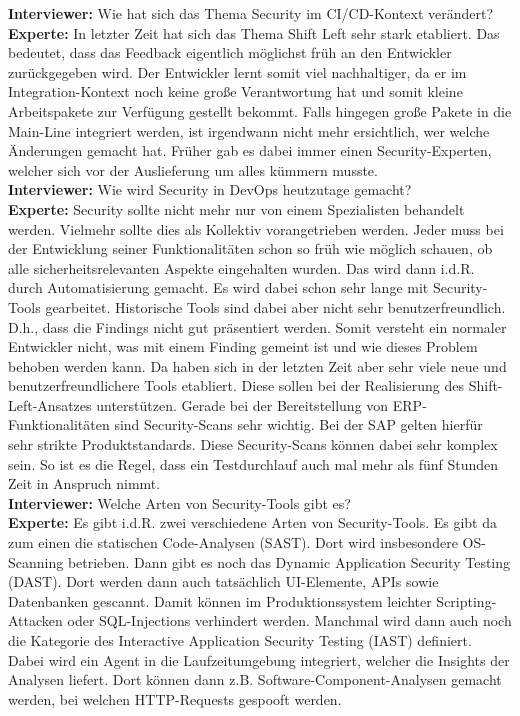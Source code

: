 \begin{linenumbers}
    \textbf{Interviewer:} Wie hat sich das Thema Security im CI/CD-Kontext verändert?\\
    \textbf{Experte:} In letzter Zeit hat sich das Thema Shift Left sehr stark etabliert. Das bedeutet, dass das Feedback eigentlich möglichst früh an den Entwickler zurückgegeben wird. Der Entwickler lernt somit viel nachhaltiger, da er im Integration-Kontext noch keine große Verantwortung hat und somit kleine Arbeitspakete zur Verfügung gestellt bekommt. Falls hingegen große Pakete in die Main-Line integriert werden, ist irgendwann nicht mehr ersichtlich, wer welche Änderungen gemacht hat. Früher gab es dabei immer einen Security-Experten, welcher sich vor der Auslieferung um alles kümmern musste.\\
    \textbf{Interviewer:} Wie wird Security in DevOps heutzutage gemacht?\\
    \textbf{Experte:} Security sollte nicht mehr nur von einem Spezialisten behandelt werden. Vielmehr sollte dies als Kollektiv vorangetrieben werden. Jeder muss bei der Entwicklung seiner Funktionalitäten schon so früh wie möglich schauen, ob alle sicherheitsrelevanten Aspekte eingehalten wurden. Das wird dann i.d.R. durch Automatisierung gemacht. Es wird dabei schon sehr lange mit Security-Tools gearbeitet. Historische Tools sind dabei aber nicht sehr benutzerfreundlich. D.h., dass die Findings nicht gut präsentiert werden. Somit versteht ein normaler Entwickler nicht, was mit einem Finding gemeint ist und wie dieses Problem behoben werden kann. Da haben sich in der letzten Zeit aber sehr viele neue und benutzerfreundlichere Tools etabliert. Diese sollen bei der Realisierung des Shift-Left-Ansatzes unterstützen. Gerade bei der Bereitstellung von ERP-Funktionalitäten sind Security-Scans sehr wichtig. Bei der SAP gelten hierfür sehr strikte Produktstandards. Diese Security-Scans können dabei sehr komplex sein. So ist es die Regel, dass ein Testdurchlauf auch mal mehr als fünf Stunden Zeit in Anspruch nimmt.\\
    \textbf{Interviewer:} Welche Arten von Security-Tools gibt es?\\
    \textbf{Experte:} Es gibt i.d.R. zwei verschiedene Arten von Security-Tools. Es gibt da zum einen die statischen Code-Analysen (SAST). Dort wird insbesondere OS-Scanning betrieben. Dann gibt es noch das Dynamic Application Security Testing (DAST). Dort werden dann auch tatsächlich UI-Elemente, APIs sowie Datenbanken gescannt. Damit können im Produktionssystem leichter Scripting-Attacken oder SQL-Injections verhindert werden. Manchmal wird dann auch noch die Kategorie des Interactive Application Security Testing (IAST) definiert. Dabei wird ein Agent in die Laufzeitumgebung integriert, welcher die Insights der Analysen liefert. Dort können dann z.B. Software-Component-Analysen gemacht werden, bei welchen HTTP-Requests gespooft werden.\\

\end{linenumbers}
